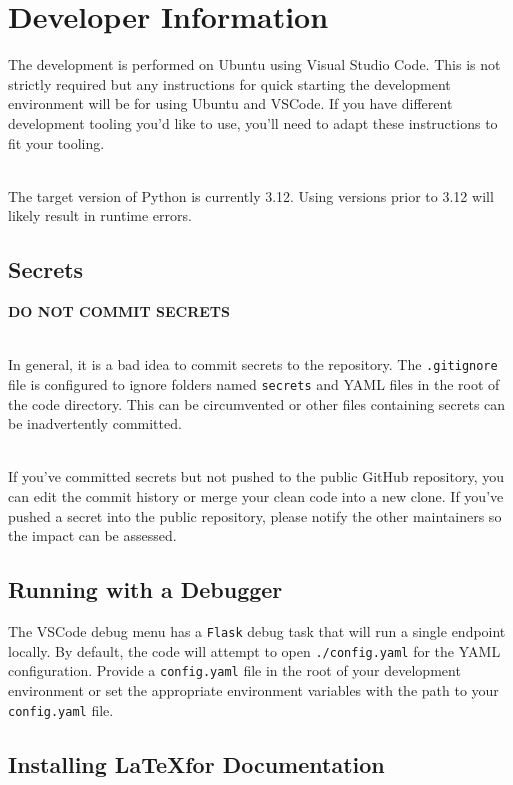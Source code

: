 \chapter{\cxoneflow Developer Information}

The development is performed on Ubuntu using Visual Studio Code.  This is not 
strictly required but any instructions for quick starting the development environment 
will be for using Ubuntu and VSCode. If you have different development tooling you'd like
to use, you'll need to adapt these instructions to fit your tooling.

\noindent\\The target version of Python is currently 3.12.  Using versions prior to 3.12 will likely result in
runtime errors.

\section{Secrets}

\textbf{DO NOT COMMIT SECRETS}

\noindent\\In general, it is a bad idea to commit secrets to the repository.  The \texttt{.gitignore} file is configured
to ignore folders named \texttt{secrets} and YAML files in the root of the code directory.  This 
can be circumvented or other files containing secrets can be inadvertently committed.

\noindent\\If you've committed secrets but not pushed to the public GitHub repository, you can edit the commit history
or merge your clean code into a new clone.  If you've pushed a secret into the public repository, please notify
the other maintainers so the impact can be assessed.

\section{Running with a Debugger}

The VSCode debug menu has a \texttt{Flask} debug task that will run a single endpoint locally.  By default,
the code will attempt to open \texttt{./config.yaml} for the YAML configuration.  Provide a
\texttt{config.yaml} file in the root of your development environment or set the appropriate environment
variables with the path to your \texttt{config.yaml} file.


\section{Installing \LaTeX\space for Documentation}

